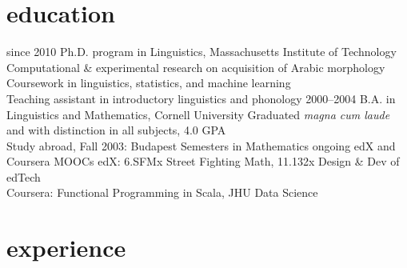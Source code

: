 \documentclass[]{friggeri-cv}
\begin{document}


\section{education}

\begin{entrylist}
  \entry
    {since 2010}
    {Ph.D. program in Linguistics, Massachusetts Institute of Technology}
    {}
    {
     \Squaredot Computational \& experimental research on acquisition of Arabic morphology \\
     \Squaredot Coursework in linguistics, statistics, and machine learning\\
     \Squaredot Teaching assistant in introductory linguistics and phonology
    }
  \entry
    {2000--2004}
    {B.A. in Linguistics and Mathematics, Cornell University}
    {}
    {
    \Squaredot Graduated \emph{magna cum laude} and with distinction in all subjects, 4.0 GPA \\
	\Squaredot Study abroad, Fall 2003: Budapest Semesters in Mathematics}
  \entry
    {ongoing}
    {edX and Coursera MOOCs}
    {}
    {
    \Squaredot edX: 6.SFMx Street Fighting Math, 11.132x Design \& Dev of edTech \\
    \Squaredot Coursera: Functional Programming in Scala, JHU Data Science}
\end{entrylist}

\section{experience}
\end{document}
